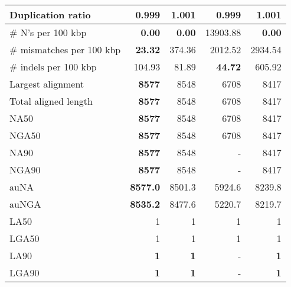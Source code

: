 \documentclass[12pt,a4paper]{article}
\begin{document}
\begin{table}[ht]
\begin{center}
\begin{tabular}{|l*{4}{|r}|}
Duplication ratio & {\bf 0.999} & 1.001 & {\bf 0.999} & 1.001 \\ \hline
\# N's per 100 kbp & {\bf 0.00} & {\bf 0.00} & 13903.88 & {\bf 0.00} \\ \hline
\# mismatches per 100 kbp & {\bf 23.32} & 374.36 & 2012.52 & 2934.54 \\ \hline
\# indels per 100 kbp & 104.93 & 81.89 & {\bf 44.72} & 605.92 \\ \hline
Largest alignment & {\bf 8577} & 8548 & 6708 & 8417 \\ \hline
Total aligned length & {\bf 8577} & 8548 & 6708 & 8417 \\ \hline
NA50 & {\bf 8577} & 8548 & 6708 & 8417 \\ \hline
NGA50 & {\bf 8577} & 8548 & 6708 & 8417 \\ \hline
NA90 & {\bf 8577} & 8548 & - & 8417 \\ \hline
NGA90 & {\bf 8577} & 8548 & - & 8417 \\ \hline
auNA & {\bf 8577.0} & 8501.3 & 5924.6 & 8239.8 \\ \hline
auNGA & {\bf 8535.2} & 8477.6 & 5220.7 & 8219.7 \\ \hline
LA50 & 1 & 1 & 1 & 1 \\ \hline
LGA50 & 1 & 1 & 1 & 1 \\ \hline
LA90 & {\bf 1} & {\bf 1} & - & {\bf 1} \\ \hline
LGA90 & {\bf 1} & {\bf 1} & - & {\bf 1} \\ \hline
\end{tabular}
\end{center}
\end{table}
\end{document}
